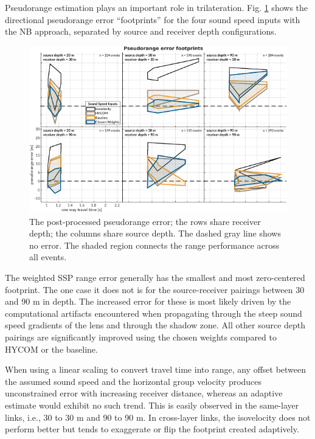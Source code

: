 Pseudorange estimation plays an important role in trilateration.
Fig. \ref{fig:rangeError} shows the directional pseudorange error ``footprints'' for the four sound speed inputs with the NB approach, separated by source and receiver depth configurations.

\begin{figure}[!ht]
\includegraphics[width=\columnwidth]{figs/range-error-allMethods.pdf}
\caption{The post-processed pseudorange error; the rows share receiver depth; the columns share source depth. The dashed gray line shows no error. The shaded region connects the range performance across all events.}
\label{fig:rangeError}
\end{figure}

The weighted SSP range error generally has the smallest and most zero-centered footprint.
The one case it does not is for the source-receiver pairings between 30 and 90 m in depth.
The increased error for these is most likely driven by the computational artifacts encountered when propagating through the steep sound speed gradients of the lens and through the shadow zone.
All other source depth pairings are significantly improved using the chosen weights compared to HYCOM or the baseline.

When using a linear scaling to convert travel time into range, any offset between the assumed sound speed and the horizontal group velocity produces unconstrained error with increasing receiver distance, whereas an adaptive estimate would exhibit no such trend.
This is easily observed in the same-layer links, i.e., 30 to 30 m and 90 to 90 m.
In cross-layer links, the isovelocity does not perform better but tends to exaggerate or flip the footprint created adaptively.

